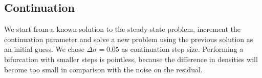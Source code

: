 


\subsection{Continuation}
 We start from a known solution to the steady-state problem, increment the continuation parameter and solve a new problem using the previous solution as an initial guess. We chose $\Delta \sigma = 0.05$ as continuation step size. Performing a bifurcation with smaller steps is pointless, because the difference in densities will become too small in comparison with the noise on the residual.

